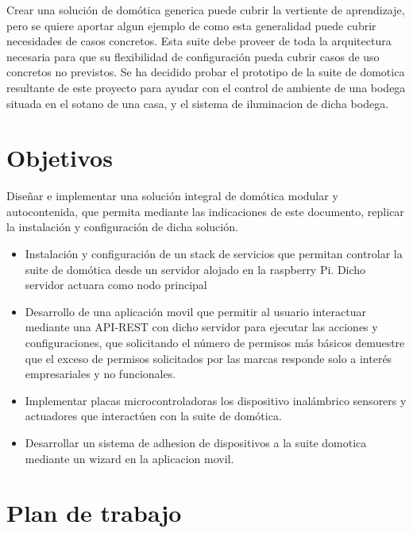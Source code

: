 \vspace{1cm}

Crear una solución de domótica generica puede cubrir la vertiente de aprendizaje, pero se quiere aportar algun ejemplo de como esta generalidad puede cubrir necesidades de casos concretos. Esta suite debe proveer de toda la arquitectura necesaria para que su flexibilidad de configuración pueda cubrir casos de uso concretos no previstos. Se ha decidido probar el prototipo de la suite de domotica resultante de este proyecto para ayudar con el control de ambiente de una bodega situada en el sotano de una casa, y el sistema de iluminacion de dicha bodega.

\section{Objetivos}
\label{ch:Capitulo1.1}

Diseñar e implementar una solución integral de domótica modular y autocontenida, que permita mediante las indicaciones de este documento, replicar la instalación y configuración de dicha solución.
\begin{itemize}
  \item Instalación y configuración de un stack de servicios que permitan controlar la suite de domótica desde un servidor alojado en la raspberry Pi. Dicho servidor actuara como nodo principal

  \item Desarrollo de una aplicación movil que permitir al usuario interactuar mediante una API-REST con dicho servidor para ejecutar las acciones y configuraciones, que solicitando el número de permisos más básicos demuestre que el exceso de permisos solicitados por las marcas responde solo a interés empresariales y no funcionales.

  \item Implementar placas microcontroladoras los dispositivo inalámbrico sensorers y actuadores que interactúen con la suite de domótica.

  \item Desarrollar un sistema de adhesion de dispositivos a la suite domotica mediante un wizard en la aplicacion movil.
\end{itemize}

\section{Plan de trabajo}
\label{ch:Capitulo1.2}

